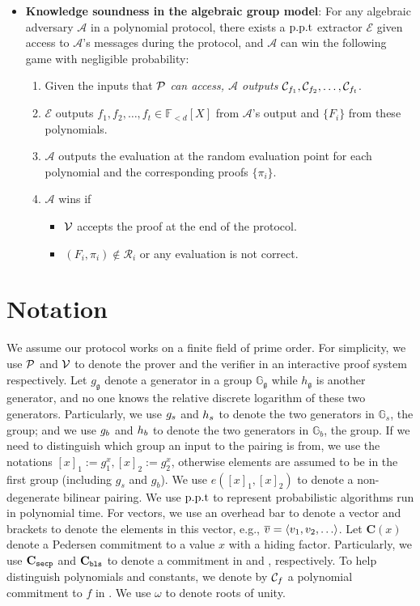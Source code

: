 \begin{definition}
\begin{itemize}
    \item \textbf{Knowledge soundness in the algebraic group model}: For any algebraic adversary $\mathcal{A}$ in a polynomial protocol, there exists a $\text{p.p.t}$ extractor $\mathcal{E}$ given access to $\mathcal{A}$'s messages during the protocol, and $\mathcal{A}$ can win the following game with negligible probability:
    \begin{enumerate}
        \item Given the inputs that $\mathcal{P}$ \textit{can access, $\mathcal{A}$ outputs} $\mathcal{C}_{f_1},\mathcal{C}_{f_2},\dots,\mathcal{C}_{f_t}$.
        \item $\mathcal{E}$ outputs $f_1,f_2,\dots,f_t\in\mathbb{F}_{<d}[X]$ from $\mathcal{A}$'s output and $\{F_i\}$ from these polynomials.
        \item $\mathcal{A}$ outputs the evaluation at the random evaluation point for each polynomial and the corresponding proofs $\{\pi_i\}$.
        \item $\mathcal{A}$ wins if
        \begin{itemize}
            \item $\mathcal{V}$ accepts the proof at the end of the protocol.
            \item $(F_i,\pi_i)\notin\mathcal{R}_i$ or any evaluation is not correct.
        \end{itemize}
    \end{enumerate}
\end{itemize}
\end{definition}

\section{Notation}

We assume our protocol works on a finite field of prime order. For simplicity, we use $\mathcal{P}$ and $\mathcal{V}$ to denote the prover and the verifier in an interactive proof system respectively. Let $g_\mathfrak{g}$ denote a generator in a group $\mathbb{G}_\mathfrak{g}$ while $h_\mathfrak{g}$ is another generator, and no one knows the relative discrete logarithm of these two generators. Particularly, we use $g_s$ and $h_s$ to denote the two generators in $\mathbb{G}_s$, the \secp group; and we use $g_b$ and $h_b$ to denote the two generators in $\mathbb{G}_b$, the \bls group. If we need to distinguish which group an input to the pairing is from, we use the notations $[x]_1:=g_1^x,[x]_2:=g_2^x$, otherwise elements are assumed to be in the first group (including $g_s$ and $g_b$). We use $e([x]_1,[x]_2)$ to denote a non-degenerate bilinear pairing. We use $\text{p.p.t}$ to represent probabilistic algorithms run in polynomial time. For vectors, we use an overhead bar to denote a vector and brackets to denote the elements in this vector, e.g., $\overline{v}=\tuple{v_1,v_2,\dots}$. Let $\textbf{C}(x)$ denote a Pedersen commitment to a value $x$ with a hiding factor. Particularly, we use $\textbf{C}_\texttt{secp}$ and $\textbf{C}_\texttt{bls}$ to denote a commitment in \secp and \bls, respectively. To help distinguish polynomials and constants, we denote by $\mathcal{C}_f$ a polynomial commitment to $f$ in \bls. We use $\omega$ to denote roots of unity.
